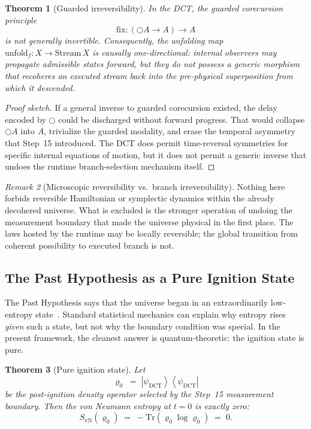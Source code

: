 \documentclass[11pt,a4paper]{article}
\theoremstyle{plain}
\newtheorem{theorem}{Theorem}[section]
\theoremstyle{definition}
\theoremstyle{remark}
\newtheorem{remark}[theorem]{Remark}
\newcommand{\nextmod}{\bigcirc}
\newcommand{\fix}{\mathrm{fix}}
\newcommand{\Stream}{\mathrm{Stream}}
\newcommand{\unfold}{\mathrm{unfold}}
\newcommand{\Tr}{\mathrm{Tr}}
\newcommand{\SvN}{S_{\mathrm{vN}}}
\providecommand{\ket}[1]{\left|#1\right\rangle}
\providecommand{\bra}[1]{\left\langle#1\right|}
\begin{document}
\begin{theorem}[Guarded irreversibility]
\label{thm:irreversibility}
In the DCT, the guarded corecursion principle
\[
    \fix : (\nextmod A \to A) \to A
\]
is not generally invertible.
Consequently, the unfolding map $\unfold_f : X \to \Stream\,X$ is causally one-directional: internal observers may propagate admissible states forward, but they do not possess a generic morphism that recoheres an executed stream back into the pre-physical superposition from which it descended.
\end{theorem}

\begin{proof}[Proof sketch]
If a general inverse to guarded corecursion existed, the delay encoded by $\nextmod$ could be discharged without forward progress.
That would collapse $\nextmod A$ into $A$, trivialize the guarded modality, and erase the temporal asymmetry that Step~15 introduced.
The DCT does permit time-reversal symmetries for specific internal equations of motion, but it does not permit a generic inverse that undoes the runtime branch-selection mechanism itself.
\end{proof}

\begin{remark}[Microscopic reversibility vs.\ branch irreversibility]
\label{rem:reversibility}
Nothing here forbids reversible Hamiltonian or symplectic dynamics within the already decohered universe.
What is excluded is the stronger operation of undoing the measurement boundary that made the universe physical in the first place.
The laws hosted by the runtime may be locally reversible; the global transition from coherent possibility to executed branch is not.
\end{remark}

\subsection{The Past Hypothesis as a Pure Ignition State}
\label{sec:past-hypothesis}

The Past Hypothesis says that the universe began in an extraordinarily low-entropy state~\cite{penrose-road,carroll}.
Standard statistical mechanics can explain why entropy rises \emph{given} such a state, but not why the boundary condition was special.
In the present framework, the cleanest answer is quantum-theoretic: the ignition state is pure.

\begin{theorem}[Pure ignition state]
\label{thm:vn-entropy}
Let
\begin{equation}
\label{eq:pure-state}
    \varrho_0
    \;=\;
    \ket{\psi_{\mathrm{DCT}}}\bra{\psi_{\mathrm{DCT}}}
\end{equation}
be the post-ignition density operator selected by the Step~15 measurement boundary.
Then the von Neumann entropy at $t = 0$ is exactly zero:
\begin{equation}
\label{eq:vn-zero}
    \SvN(\varrho_0)
    \;=\;
    -\Tr(\varrho_0 \log \varrho_0)
    \;=\;
    0.
\end{equation}
\end{theorem}
\end{document}

